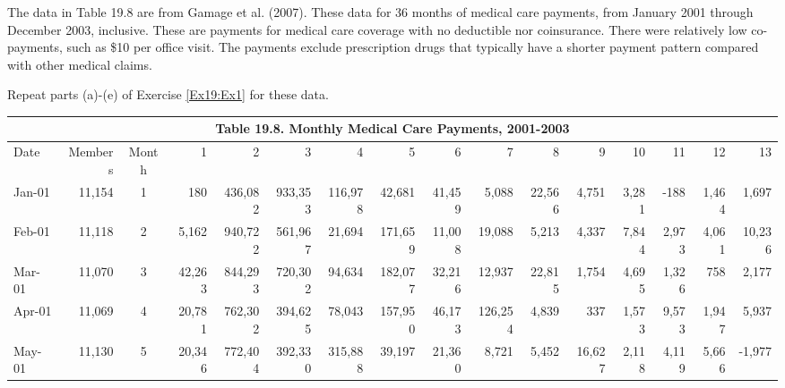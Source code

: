 \begin{exercises}
\item The data in Table 19.8 are from Gamage et al.
(2007). These data for 36 months of medical care payments, from
January 2001 through December 2003, inclusive. These are payments
for medical care coverage with no deductible nor coinsurance. There
were relatively low co-payments, such as \$10 per office visit. The
payments exclude prescription drugs that typically have a shorter
payment pattern compared with other medical claims.


Repeat parts (a)-(e) of Exercise \ref{Ex19:Ex1} for these data.

\newpage
\begin{table}\label{T19:SoAHealth}
\begin{center}
\begin{tabular}{lrcrrrrrrrrrrrrr}
\multicolumn{16}{c}{\large Table 19.8.  Monthly Medical Care Payments, 2001-2003} \\
 \hline
      Date &    Members &      Month &          1 &          2 &          3 &          4 &          5 &          6 &          7 &          8 &          9 &         10 &         11 &         12 &         13 \\
\hline
    Jan-01 &     11,154 &          1 &        180 &    436,082 &    933,353 &    116,978 &     42,681 &     41,459 &      5,088 &     22,566 &      4,751 &      3,281 &       -188 &      1,464 &      1,697 \\
    Feb-01 &     11,118 &          2 &      5,162 &    940,722 &    561,967 &     21,694 &    171,659 &     11,008 &     19,088 &      5,213 &      4,337 &      7,844 &      2,973 &      4,061 &     10,236 \\
    Mar-01 &     11,070 &          3 &     42,263 &    844,293 &    720,302 &     94,634 &    182,077 &     32,216 &     12,937 &     22,815 &      1,754 &      4,695 &      1,326 &        758 &      2,177 \\
    Apr-01 &     11,069 &          4 &     20,781 &    762,302 &    394,625 &     78,043 &    157,950 &     46,173 &    126,254 &      4,839 &        337 &      1,573 &      9,573 &      1,947 &      5,937 \\
    May-01 &     11,130 &          5 &     20,346 &    772,404 &    392,330 &    315,888 &     39,197 &     21,360 &      8,721 &      5,452 &     16,627 &      2,118 &      4,119 &      5,666 &     -1,977 \\

\end{tabular}
\end{center}
\end{table}
\end{exercises}
